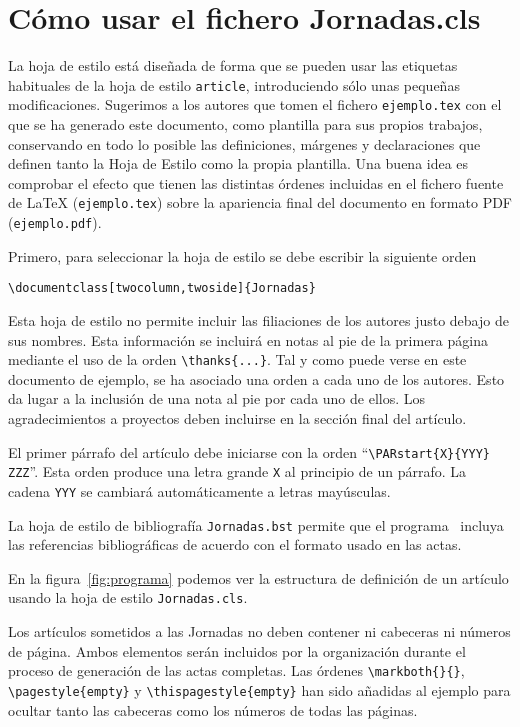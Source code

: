 \section{Cómo usar el fichero Jornadas.cls}

La hoja de estilo está diseñada de forma que se pueden usar las etiquetas
habituales de la hoja de estilo {\tt article}, introduciendo sólo unas pequeñas
modificaciones. Sugerimos a los autores que tomen el fichero {\tt ejemplo.tex}
con el que se ha generado este documento, como plantilla para sus propios
trabajos, conservando en todo lo posible las definiciones, márgenes y
declaraciones que definen tanto la Hoja de Estilo como la propia plantilla. Una
buena idea es comprobar el efecto que tienen las distintas órdenes incluidas en
el fichero fuente de \LaTeX{} ({\tt ejemplo.tex}) sobre la apariencia final del
documento en formato PDF ({\tt ejemplo.pdf}).

Primero, para seleccionar la hoja de estilo se debe escribir la siguiente orden
\begin{center}
\verb+\documentclass[twocolumn,twoside]{Jornadas}+
\end{center}

Esta hoja de estilo no permite incluir las filiaciones de los autores justo
debajo de sus nombres. Esta información se incluirá en notas al pie de la
primera página mediante el uso de la orden \verb+\thanks{...}+. Tal y como puede
verse en este documento de ejemplo, se ha asociado una orden a cada uno de los
autores. Esto da lugar a la inclusión de una nota al pie por cada uno de ellos.
Los agradecimientos a proyectos deben incluirse en la sección final del
artículo.

El primer párrafo del artículo debe iniciarse con la orden
``\verb+\PARstart{X}{YYY} ZZZ+''. Esta orden produce una letra grande \verb+X+
al principio de un párrafo. La cadena \verb+YYY+ se cambiará automáticamente a
letras mayúsculas.

La hoja de estilo de bibliografía {\tt Jornadas.bst} permite que el programa
\BibTeX\ incluya las referencias bibliográficas de acuerdo con el formato usado
en las actas.

En la figura~\ref{fig:programa} podemos ver la estructura de definición de un
artículo usando la hoja de estilo {\tt Jornadas.cls}. 
 
Los artículos sometidos a las Jornadas no deben contener ni cabeceras ni números
de página. Ambos elementos serán incluidos por la organización durante el
proceso de generación de las actas completas. Las órdenes \verb+\markboth{}{}+,
\verb+\pagestyle{empty}+ y \verb+\thispagestyle{empty}+ han sido añadidas al
ejemplo para ocultar tanto las cabeceras como los números de todas las páginas. 


